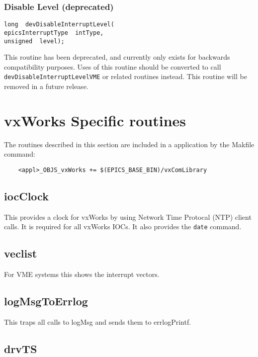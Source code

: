 \subsubsection{Disable Level (deprecated)}

\begin{verbatim}long  devDisableInterruptLevel(
epicsInterruptType  intType,
unsigned  level);
\end{verbatim}This routine has been deprecated, and currently only exists for backwards compatibility purposes. Uses of this routine 
should be converted to call \verb|devDisableInterruptLevelVME| or related routines instead. This routine will be 
removed in a future release.

\section{vxWorks Specific routines}

The routines described in this section are included in a application by the Makfile command:

\begin{verbatim}    <appl>_OBJS_vxWorks += $(EPICS_BASE_BIN)/vxComLibrary
\end{verbatim}\subsection{iocClock}

This provides a clock for vxWorks by using Network Time Protocal (NTP) client calls. It is required for all vxWorks 
IOCs. It also provides the \verb|date| command.

\subsection{veclist}

For VME systems this shows the interrupt vectors.

\subsection{logMsgToErrlog}

This traps all calls to logMsg and sends them to errlogPrintf.

\subsection{drvTS}

